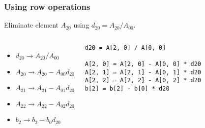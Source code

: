 \begin{frame}[fragile]
  \frametitle{Using row operations}
  Eliminate element $A_{20}$ using $d_{20}=A_{20}/A_{00}$.
  \vfill
  \vfill\pause
  \begin{columns}
  \begin{itemize}
    \item $d_{20}\rightarrow A_{20}/A_{00}$
    \item $A_{20}\rightarrow A_{20}-A_{00}d_{20}$
    \item $A_{21}\rightarrow A_{21}-A_{01}d_{20}$
    \item $A_{22}\rightarrow A_{22}-A_{02}d_{20}$
    \item $b_2   \rightarrow b_2   -b_0   d_{20}$
  \end{itemize}
  \begin{lstlisting}
d20 = A[2, 0] / A[0, 0]

A[2, 0] = A[2, 0] - A[0, 0] * d20
A[2, 1] = A[2, 1] - A[0, 1] * d20
A[2, 2] = A[2, 2] - A[0, 2] * d20
b[2] = b[2] - b[0] * d20
  \end{lstlisting}
  \end{columns}
\end{frame}


